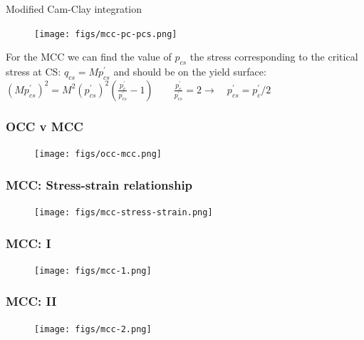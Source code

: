 \documentclass[notes]{beamer}
\begin{document}
\begin{frame}{Modified Cam-Clay integration}
	\begin{figure}
		\texttt{[image: figs/mcc-pc-pcs.png]}
	\end{figure}
	For the MCC we can find the value of $p_{cs}$ the stress corresponding to the critical stress at CS: $q_{cs} = M p^\prime_{cs}$ and should be on the yield surface: $(M p^\prime_{cs})^2 = M^2 (p^\prime_{cs})^2 \left(\frac{p_c^\prime}{p_{cs}^\prime} -1 \right) \qquad \frac{p_c^\prime}{p_{cs}^\prime}  = 2 \rightarrow \quad p_{cs}^\prime =  p_c^\prime / 2$

\end{frame}


\begin{frame}
\frametitle{OCC v MCC}
	\begin{figure}
	\texttt{[image: figs/occ-mcc.png]}
\end{figure}
\end{frame}

\begin{frame}
\frametitle{MCC: Stress-strain relationship}
\begin{figure}
	\texttt{[image: figs/mcc-stress-strain.png]}
\end{figure}
\end{frame}

\begin{frame}
\frametitle{MCC: I}
\begin{figure}
	\texttt{[image: figs/mcc-1.png]}
\end{figure}
\end{frame}

\begin{frame}
\frametitle{MCC: II}
\begin{figure}
	\texttt{[image: figs/mcc-2.png]}
\end{figure}
\end{frame}


\end{document}
